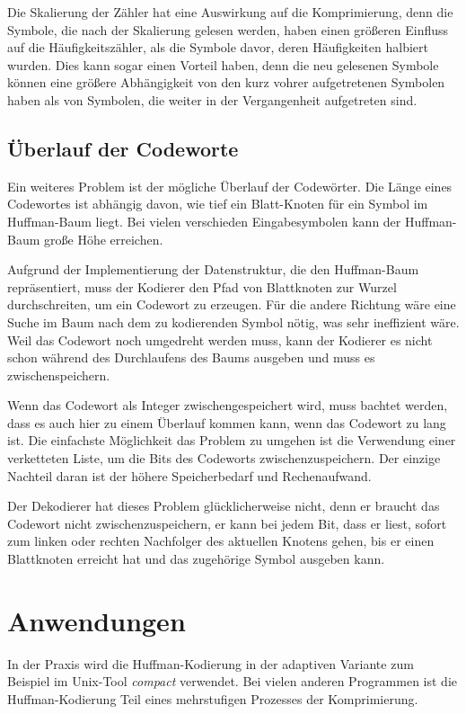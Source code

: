\documentclass[twoside,11pt,a4paper]{article}
\theoremstyle{break}
\begin{document}
Die Skalierung der Zähler hat eine Auswirkung auf die Komprimierung,
denn die Symbole, die nach der Skalierung gelesen werden, haben einen
größeren Einfluss auf die Häufigkeitszähler, als die Symbole davor,
deren Häufigkeiten halbiert wurden. Dies kann sogar einen Vorteil
haben, denn die neu gelesenen Symbole können eine größere Abhängigkeit
von den kurz vohrer aufgetretenen Symbolen haben als von Symbolen, die
weiter in der Vergangenheit aufgetreten sind.

\subsection{Überlauf der Codeworte}
Ein weiteres Problem ist der mögliche Überlauf der Codewörter. Die
Länge eines Codewortes ist abhängig davon, wie tief ein Blatt-Knoten
für ein Symbol im Huffman-Baum liegt. Bei vielen verschieden
Eingabesymbolen kann der Huffman-Baum große Höhe erreichen.

Aufgrund der Implementierung der Datenstruktur, die den Huffman-Baum
repräsentiert, muss der Kodierer den Pfad von Blattknoten zur Wurzel
durchschreiten, um ein Codewort zu erzeugen. Für die andere Richtung
wäre eine Suche im Baum nach dem zu kodierenden Symbol nötig, was sehr
ineffizient wäre. Weil das Codewort noch umgedreht werden muss, kann
der Kodierer es nicht schon während des Durchlaufens des Baums
ausgeben und muss es zwischenspeichern.

Wenn das Codewort als Integer zwischengespeichert wird, muss bachtet
werden, dass es auch hier zu einem Überlauf kommen kann, wenn das
Codewort zu lang ist. Die einfachste Möglichkeit das Problem zu
umgehen ist die Verwendung einer verketteten Liste, um die Bits des
Codeworts zwischenzuspeichern.  Der einzige Nachteil daran ist der
höhere Speicherbedarf und Rechenaufwand.

Der Dekodierer hat dieses Problem glücklicherweise nicht, denn er
braucht das Codewort nicht zwischenzuspeichern, er kann bei jedem Bit,
dass er liest, sofort zum linken oder rechten Nachfolger des aktuellen
Knotens gehen, bis er einen Blattknoten erreicht hat und das
zugehörige Symbol ausgeben kann.

\section{Anwendungen}
In der Praxis wird die Huffman-Kodierung in der adaptiven Variante zum
Beispiel im Unix-Tool \emph{compact} verwendet. Bei vielen anderen
Programmen ist die Huffman-Kodierung Teil eines mehrstufigen Prozesses
der Komprimierung.
\end{document}
